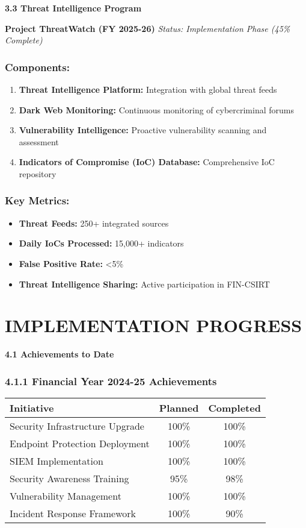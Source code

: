 \documentclass[12pt,a4paper]{report}
\newcommand{\sectionheader}[1]{\textbf{\color{govblue}#1}}
\newcommand{\initiative}[1]{\textbf{\color{secgreen}\ding{51} #1}}
\newcommand{\progress}[1]{\textit{#1}}
\begin{document}
\sectionheader{3.3 Threat Intelligence Program}

\initiative{Project ThreatWatch (FY 2025-26)}
\progress{Status: Implementation Phase (45\% Complete)}

\subsection*{Components:}
\begin{enumerate}[leftmargin=*, itemsep=4pt]
    \item \textbf{Threat Intelligence Platform:} Integration with global threat feeds
    \item \textbf{Dark Web Monitoring:} Continuous monitoring of cybercriminal forums
    \item \textbf{Vulnerability Intelligence:} Proactive vulnerability scanning and assessment
    \item \textbf{Indicators of Compromise (IoC) Database:} Comprehensive IoC repository
\end{enumerate}

\subsection*{Key Metrics:}
\begin{itemize}[leftmargin=*, itemsep=3pt]
    \item \textbf{Threat Feeds:} 250+ integrated sources
    \item \textbf{Daily IoCs Processed:} 15,000+ indicators
    \item \textbf{False Positive Rate:} <5\%
    \item \textbf{Threat Intelligence Sharing:} Active participation in FIN-CSIRT
\end{itemize}

\chapter{IMPLEMENTATION PROGRESS}

\sectionheader{4.1 Achievements to Date}

\subsection*{4.1.1 Financial Year 2024-25 Achievements}
\begin{table}[h]
\centering
\begin{tabular}{@{}lcc@{}}
\toprule
\textbf{Initiative} & \textbf{Planned} & \textbf{Completed} \\
\midrule
Security Infrastructure Upgrade & 100\% & 100\% \\
Endpoint Protection Deployment & 100\% & 100\% \\
SIEM Implementation & 100\% & 100\% \\
Security Awareness Training & 95\% & 98\% \\
Vulnerability Management & 100\% & 100\% \\
Incident Response Framework & 100\% & 90\% \\
\bottomrule
\end{tabular}
\end{table}
\end{document}
